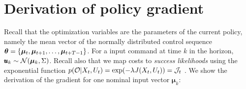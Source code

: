 \section{Derivation of policy gradient}\label{sec:app_derivation_policy_gradient}
Recall that the optimization variables are the parameters of the current policy, namely the mean vector of the normally distributed control sequence $\boldsymbol{\theta} = \{\boldsymbol{\mu}_t,  \boldsymbol{\mu}_{t+1}, \dots, \boldsymbol{\mu}_{t+T-1} \}$. For a input command at time $k$ in the horizon, $\pmb{u}_k \sim \mathcal{N}(\boldsymbol{\mu}_k, \Sigma)$. Recall also that we map costs to \emph{success likelihoods} using the exponential function $p(\mathcal{O} | X_t, U_t) = \exp(-\lambda J(X_t, U_t)) = \mathcal{J}_t$ . We show the derivation of the gradient for one nominal input vector $\boldsymbol{\mu}_k$:

